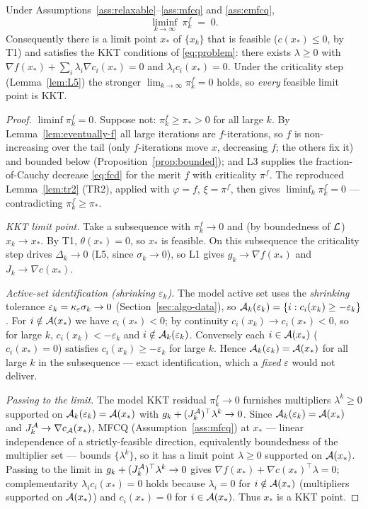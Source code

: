 \begin{theorem}
  \label{thm:T2}
  Under Assumptions~\ref{ass:relaxable}--\ref{ass:mfcq} and \ref{ass:emfcq},
  \[
    \liminf_{k\to\infty}\ \pi_k^f \;=\; 0 .
  \]
  Consequently there is a limit point $x_*$ of $\{x_k\}$ that is feasible
  ($c(x_*)\le0$, by T1) and satisfies the KKT conditions of \eqref{eq:problem}: there
  exists $\lambda\ge0$ with $\nabla f(x_*)+\sum_i\lambda_i\nabla c_i(x_*)=0$ and
  $\lambda_i c_i(x_*)=0$. Under the criticality step (Lemma~\ref{lem:L5}) the stronger
  $\lim_{k\to\infty}\pi_k^f=0$ holds, so \emph{every} feasible limit point is KKT.
\end{theorem}
\begin{proof}
  \emph{$\liminf\pi_k^f=0$.} Suppose not: $\pi_k^f\ge\pi_*>0$ for all large $k$.
  By Lemma~\ref{lem:eventually-f} all large iterations are $f$-iterations, so $f$ is
  non-increasing over the tail (only $f$-iterations move $x$, decreasing $f$; the
  others fix it) and bounded below (Proposition~\ref{prop:bounded}); and L3 supplies
  the fraction-of-Cauchy decrease \eqref{eq:fcd} for the merit $f$ with criticality
  $\pi^f$. The reproduced Lemma~\ref{lem:tr2} (TR2), applied with $\varphi=f$,
  $\xi=\pi^f$, then gives $\liminf_k\pi_k^f=0$ --- contradicting $\pi_k^f\ge\pi_*$.

  \emph{KKT limit point.} Take a subsequence with $\pi_k^f\to0$ and (by boundedness
  of $\mathcal{L}$) $x_k\to x_*$. By T1, $\theta(x_*)=0$, so $x_*$ is feasible. On this
  subsequence the criticality step drives $\Delta_k\to0$ (L5, since
  $\sigma_k\to0$), so L1 gives $g_k\to\nabla f(x_*)$ and $J_k\to\nabla c(x_*)$.

  \emph{Active-set identification (shrinking $\varepsilon_k$).} The model
  active set uses the \emph{shrinking} tolerance
  $\varepsilon_k=\kappa_{\varepsilon}\sigma_k\to0$ (Section~\ref{sec:algo-data}), so
  $\mathcal{A}_k(\varepsilon_k)=\{i:c_i(x_k)\ge-\varepsilon_k\}$. For $i\notin\mathcal{A}(x_*)$ we have
  $c_i(x_*)<0$; by continuity $c_i(x_k)\to c_i(x_*)<0$, so for large $k$,
  $c_i(x_k)<-\varepsilon_k$ and $i\notin\mathcal{A}_k(\varepsilon_k)$. Conversely each
  $i\in\mathcal{A}(x_*)$ ($c_i(x_*)=0$) satisfies $c_i(x_k)\ge-\varepsilon_k$ for large $k$.
  Hence $\mathcal{A}_k(\varepsilon_k)=\mathcal{A}(x_*)$ for all large $k$ in the subsequence --- exact
  identification, which a \emph{fixed} $\varepsilon$ would not deliver.

  \emph{Passing to the limit.} The model KKT residual $\pi_k^f\to0$ furnishes
  multipliers $\lambda^k\ge0$ supported on $\mathcal{A}_k(\varepsilon_k)=\mathcal{A}(x_*)$ with
  $g_k+(J_k^{\mathcal{A}})^\top\lambda^k\to0$. Since $\mathcal{A}_k(\varepsilon_k)=\mathcal{A}(x_*)$ and
  $J_k^{\mathcal{A}}\to\nabla c_{\mathcal{A}}(x_*)$, MFCQ (Assumption~\ref{ass:mfcq}) at $x_*$ ---
  linear independence of a strictly-feasible direction, equivalently boundedness of
  the multiplier set --- bounds $\{\lambda^k\}$, so it has a limit point
  $\lambda\ge0$ supported on $\mathcal{A}(x_*)$. Passing to the limit in
  $g_k+(J_k^{\mathcal{A}})^\top\lambda^k\to0$ gives $\nabla f(x_*)+\nabla c(x_*)^\top\lambda=0$;
  complementarity $\lambda_ic_i(x_*)=0$ holds because $\lambda_i=0$ for
  $i\notin\mathcal{A}(x_*)$ (multipliers supported on $\mathcal{A}(x_*)$) and $c_i(x_*)=0$ for
  $i\in\mathcal{A}(x_*)$. Thus $x_*$ is a KKT point.


\end{proof}
